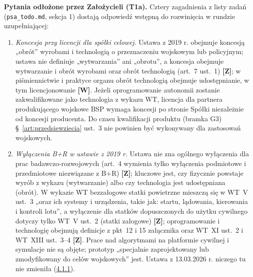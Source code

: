 \documentclass[12pt,a4paper]{report}
\newcommand{\Wiar}[1]{\textbf{[#1]}}
\begin{document}
\textbf{Pytania odłożone przez Założycieli (T1a).} Cztery zagadnienia z listy zadań (\texttt{psa\_todo.md}, sekcja 1) dostają odpowiedź wstępną do rozwinięcia w rundzie uzupełniającej:
\begin{enumerate}
  \item \emph{Koncesja przy licencji dla spółki celowej.} Ustawa z 2019 r. obejmuje koncesją „obrót” wyrobami i technologią o przeznaczeniu wojskowym lub policyjnym; ustawa nie definiuje „wytwarzania” ani „obrotu”, a koncesja obejmuje wytwarzanie i obrót wyrobami oraz obrót technologią (art.~7 ust.~1) \Wiar{Z}; w piśmiennictwie i praktyce organu obrót technologią obejmuje udostępnianie, w tym licencjonowanie \Wiar{W}. Jeżeli oprogramowanie autonomii zostanie zakwalifikowane jako technologia z wykazu WT, licencja dla partnera produkującego wojskowe BSP wymaga koncesji po stronie Spółki niezależnie od koncesji producenta. Do czasu kwalifikacji produktu (bramka G3) §~\ref{art:przedsiewziecia} ust.~3 nie powinien być wykonywany dla zastosowań wojskowych.
  \item \emph{Wyłączenia B+R w ustawie z 2019 r.} Ustawa nie zna ogólnego wyłączenia dla prac badawczo-rozwojowych (art.~4 wymienia tylko wyłączenia podmiotowe i przedmiotowe niezwiązane z B+R) \Wiar{Z}; kluczowe jest, czy fizycznie powstaje wyrób z wykazu (wytwarzanie) albo czy technologia jest udostępniana (obrót). W wykazie WT bezzałogowe statki powietrzne mieszczą się w WT~V ust.~3 „oraz ich systemy i urządzenia, takie jak: startu, lądowania, kierowania i kontroli lotu”, a wyłączenie dla statków dopuszczonych do użytku cywilnego dotyczy tylko WT~V ust.~2 (statki załogowe) \Wiar{Z}; oprogramowanie i technologię obejmują definicje z pkt~12 i 15 załącznika oraz WT~XI ust.~2 i WT~XIII ust.~3--4 \Wiar{Z}. Prace nad algorytmami na platformie cywilnej i symulacje nie są objęte; prototyp „specjalnie zaprojektowany lub zmodyfikowany do celów wojskowych” jest. Ustawa z 13.03.2026 r. niczego tu nie zmieniła (\hyperref[memo:4.1.1]{4.1.1}).

\end{enumerate}
\end{document}

